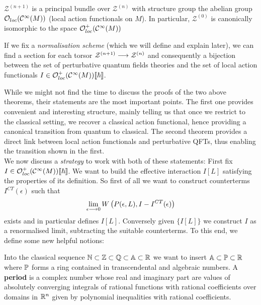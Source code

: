 \begin{theo}
  $\mathcal{Z}^{(n+1)}$ is a principal bundle over $\mathcal{Z}^{(n)}$ with structure group the abelian group $\mathcal{O}_{loc}(\mathcal{C}^{\infty}(M))$ (local action functionals on $M$). In particular, $\mathcal{Z}^{(0)}$ is canonically isomorphic to the space $\mathcal{O}^+_{loc}(\mathcal{C}^{\infty}(M))$
\end{theo}

\begin{theo}
  If we fix a \emph{normalisation scheme} (which we will define and explain later), we can find a section for each torsor $\mathcal{Z}^{(n+1)} \longrightarrow \mathcal{Z}^{(n)}$ and consequently a bijection between the set of perturbative quantum fields theories and the set of local action functionals $I \in \mathcal{O}^+_{loc}(\mathcal{C}^{\infty}(M))\llbracket \hbar \rrbracket$.
\end{theo}

While we might not find the time to discuss the proofs of the two above theorems, their statements are the most important points. The first one provides convenient and interesting structure, mainly telling us that once we restrict to the classical setting, we recover a classical action functional, hence providing a canonical transition from quantum to classical. The second theorem provides a direct link between local action functionals and perturbative QFTs, thus enabling the transition shown in the first.\\

We now discuss a \textit{strategy} to work with both of these statements: First fix $I \in \mathcal{O}^+_{loc}(\mathcal{C}^{\infty}(M))\llbracket \hbar \rrbracket$. We want to build the effective interaction $I[L]$ satisfying the properties of its definition. So first of all we want to construct counterterms $I^{CT}(\epsilon)$ such that
$$ \lim_{\epsilon \lra 0} W\left(P(\epsilon,L), I-I^{CT}(\epsilon)\right)$$
exists and in particular defines $I[L]$. Conversely given $\{I[L]\}$ we construct $I$ as a renormalised limit, subtracting the suitable counterterms. To this end, we define some new helpful notions:

\begin{definition}[Periods]
  Into the classical sequence $\mathbb{N} \subset \mathbb{Z} \subset \mathbb{Q} \subset \mathbb{A} \subset \mathbb{R}$ we want to insert $\mathbb{A} \subset \mathbb{P} \subset \mathbb{R}$ where $\mathbb{P}$ forms a ring contained in transcendental and algebraic numbers. A \textbf{period} is a complex number whose real and imaginary part are values of absolutely converging integrals of rational functions with rational coefficients over domains in $\mathbb{R}^n$ given by polynomial inequalities with rational coefficients.
\end{definition}

